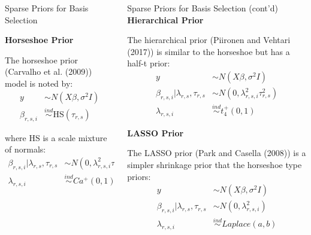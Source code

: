 \documentclass[final]{beamer}
\newlength{\onecolwid}
\newlength{\twocolwid}
\begin{document}
\begin{frame}[t]
\begin{columns}[t]
\begin{column}{\twocolwid}
\begin{columns}[t,totalwidth=\twocolwid]
\begin{column}{\onecolwid}
\begin{block}{Sparse Priors for Basis Selection}
\vspace{10mm}

\textbf{Horseshoe Prior}

The horseshoe prior (Carvalho et al. (2009)) model is noted by:
\begin{align}
y &\sim N(X\beta, \sigma^2 I) \nonumber \\
\beta_{r,s,i} &\overset{ind}{\sim} \text{HS}(\tau_{r,s})
\end{align}

where $\text{HS}$ is a scale mixture of normals:
\begin{align}
\beta_{r,s,i} | \lambda_{r,s}, \tau_{r,s} &\sim N(0, \lambda_{r,s,i}^2 \tau_{r,s}^2) \nonumber \\
\lambda_{r,s,i} &\overset{ind}{\sim} Ca^{+}(0,1)
\end{align}

\end{block}


\end{column} %

\begin{column}{\onecolwid}\vspace{-.6in} %


\begin{block}{Sparse Priors for Basis Selection (cont'd)}
\textbf{Hierarchical Prior}

The hierarchical prior (Piironen and Vehtari (2017)) is similar to the horseshoe but has a half-t prior:
\begin{align}
y &\sim N(X\beta, \sigma^2 I) \nonumber \\
\beta_{r,s,i} | \lambda_{r,s}, \tau_{r,s} &\sim N(0, \lambda_{r,s,i}^2 \tau_{r,s}^2) \nonumber \\
\lambda_{r,s,i} &\overset{ind}{\sim} t^{+}_{4}(0,1)
\end{align}

\vspace{10mm}

\textbf{LASSO Prior}

The LASSO prior (Park and Casella (2008)) is a simpler shrinkage prior that the horseshoe type priors:
\begin{align}
y &\sim N(X\beta, \sigma^2 I) \nonumber \\
\beta_{r,s,i} | \lambda_{r,s}, \tau_{r,s} &\sim N(0, \lambda_{r,s,i}^2) \nonumber \\
\lambda_{r,s,i} &\overset{ind}{\sim} Laplace(a,b)
\end{align}


\end{block}
\end{column}
\end{columns}
\end{column}
\end{columns}
\end{frame}
\end{document}

